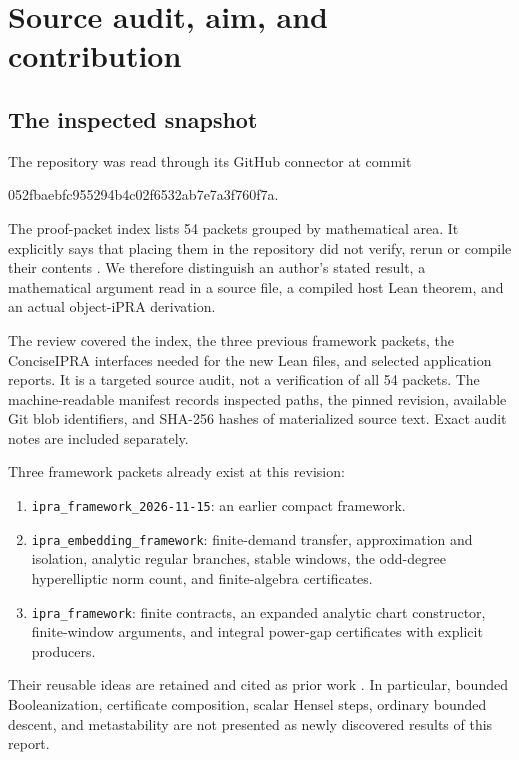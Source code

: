 \section{Source audit, aim, and contribution}
\label{sec:audit}

\subsection{The inspected snapshot}

The repository was read through its GitHub connector at commit
\begin{center}\small\ttfamily
052fbaebfc955294b4c02f6532ab7e7a3f760f7a.
\end{center}
The proof-packet index lists 54 packets grouped by mathematical area.
It explicitly says that placing them in the repository did not verify,
rerun or compile their contents \cite{repoIndex}. We therefore distinguish
an author's stated result, a mathematical argument read in a source file,
a compiled host Lean theorem, and an actual object-iPRA derivation.

The review covered the index, the three previous framework packets, the
ConciseIPRA interfaces needed for the new Lean files, and selected
application reports. It is a targeted source audit, not a verification of
all 54 packets. The machine-readable manifest records inspected paths,
the pinned revision, available Git blob identifiers, and SHA-256 hashes
of materialized source text. Exact audit notes are included separately.

Three framework packets already exist at this revision:
\begin{enumerate}
\item \texttt{ipra\_framework\_2026-11-15}: an earlier compact framework.
\item \texttt{ipra\_embedding\_framework}: finite-demand transfer,
approximation and isolation, analytic regular branches, stable windows,
the odd-degree hyperelliptic norm count, and finite-algebra certificates.
\item \texttt{ipra\_framework}: finite contracts, an expanded analytic
chart constructor, finite-window arguments, and integral power-gap
certificates with explicit producers.
\end{enumerate}
Their reusable ideas are retained and cited as prior work
\cite{repoSmallFramework,repoEmbedding,repoFramework}. In particular,
bounded Booleanization, certificate composition, scalar Hensel steps,
ordinary bounded descent, and metastability are not presented as newly
discovered results of this report.

